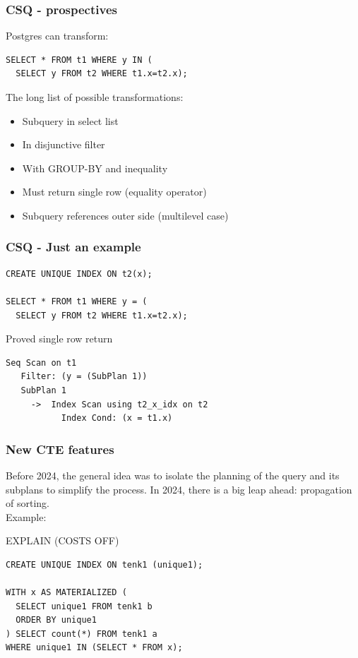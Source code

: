 \documentclass{beamer}
\begin{document}
\begin{frame}[fragile]\frametitle{CSQ - prospectives}
Postgres can transform:
\begin{lstlisting}
SELECT * FROM t1 WHERE y IN (
  SELECT y FROM t2 WHERE t1.x=t2.x);
\end{lstlisting}
The long list of possible transformations:
\begin{itemize}
  \item Subquery in select list
  \item In disjunctive filter
  \item With GROUP-BY and inequality
  \item Must return single row (equality operator)
  \item Subquery references outer side (multilevel case)
\end{itemize}
\end{frame}

\begin{frame}[fragile]\frametitle{CSQ - Just an example}
\begin{lstlisting}
CREATE UNIQUE INDEX ON t2(x);

SELECT * FROM t1 WHERE y = (
  SELECT y FROM t2 WHERE t1.x=t2.x);
\end{lstlisting}
\begin{block}{Proved single row return}
\begin{lstlisting}[basicstyle=\footnotesize]
 Seq Scan on t1
   Filter: (y = (SubPlan 1))
   SubPlan 1
     ->  Index Scan using t2_x_idx on t2
           Index Cond: (x = t1.x)
\end{lstlisting}\end{block}
\end{frame}

\begin{frame}[fragile]\frametitle{New CTE features}
Before 2024, the general idea was to isolate the planning of the query and its subplans to simplify the process. In 2024, there is a big leap ahead: propagation of sorting. \\ Example: \\
\begin{block}{EXPLAIN (COSTS OFF)}
\begin{lstlisting}
CREATE UNIQUE INDEX ON tenk1 (unique1);

WITH x AS MATERIALIZED (
  SELECT unique1 FROM tenk1 b
  ORDER BY unique1
) SELECT count(*) FROM tenk1 a
WHERE unique1 IN (SELECT * FROM x);
\end{lstlisting}
\end{block}
\end{frame}
\end{document}

